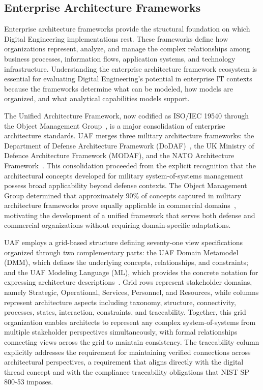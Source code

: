 \subsection{Enterprise Architecture Frameworks}

Enterprise architecture frameworks provide the structural foundation on which Digital Engineering implementations rest. These frameworks define how organizations represent, analyze, and manage the complex relationships among business processes, information flows, application systems, and technology infrastructure. Understanding the enterprise architecture framework ecosystem is essential for evaluating Digital Engineering's potential in enterprise IT contexts because the frameworks determine what can be modeled, how models are organized, and what analytical capabilities models support.

The Unified Architecture Framework, now codified as ISO/IEC 19540 through the Object Management Group~\parencite{OMG_UAF_2022}, is a major consolidation of enterprise architecture standards. UAF merges three military architecture frameworks: the Department of Defense Architecture Framework (DoDAF)~\parencite{DoDAF_2009}, the UK Ministry of Defence Architecture Framework (MODAF), and the NATO Architecture Framework~\parencite{NATO_NAF_2018}. This consolidation proceeded from the explicit recognition that the architectural concepts developed for military system-of-systems management possess broad applicability beyond defense contexts. The Object Management Group determined that approximately 90\% of concepts captured in military architecture frameworks prove equally applicable in commercial domains~\parencite{OMG_UAF_About_2024}, motivating the development of a unified framework that serves both defense and commercial organizations without requiring domain-specific adaptations.

UAF employs a grid-based structure defining seventy-one view specifications organized through two complementary parts: the UAF Domain Metamodel (DMM), which defines the underlying concepts, relationships, and constraints; and the UAF Modeling Language (ML), which provides the concrete notation for expressing architecture descriptions~\parencite{OMG_UAF_Spec_2022}. Grid rows represent stakeholder domains, namely Strategic, Operational, Services, Personnel, and Resources, while columns represent architecture aspects including taxonomy, structure, connectivity, processes, states, interaction, constraints, and traceability. Together, this grid organization enables architects to represent any complex system-of-systems from multiple stakeholder perspectives simultaneously, with formal relationships connecting views across the grid to maintain consistency. The traceability column explicitly addresses the requirement for maintaining verified connections across architectural perspectives, a requirement that aligns directly with the digital thread concept and with the compliance traceability obligations that NIST SP 800-53 imposes.

